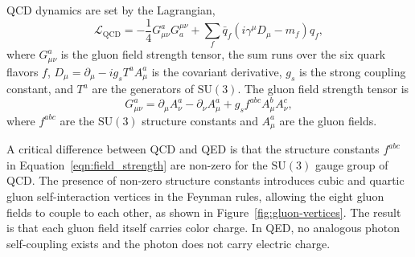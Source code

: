 QCD dynamics are set by the Lagrangian,
\begin{equation}
  \mathcal{L}_{\mathrm{QCD}} = -\frac{1}{4} G^a_{\mu\nu} G^{\mu\nu}_a + \sum_f \bar{q}_f \left( i \gamma^\mu D_\mu - m_f \right) q_f,
  \label{eqn:qcd_lagrangian}
\end{equation}
where $G^a_{\mu\nu}$ is the gluon field strength tensor, the sum runs over the six quark flavors $f$, $D_\mu = \partial_\mu - i g_s T^a A^a_\mu$ is the covariant derivative, $g_s$ is the strong coupling constant, and $T^a$ are the generators of $\mathrm{SU}(3)$.
The gluon field strength tensor is
\begin{equation}
  G^a_{\mu\nu} = \partial_\mu A^a_\nu - \partial_\nu A^a_\mu + g_s f^{abc} A^b_\mu A^c_\nu,
  \label{eqn:field_strength}
\end{equation}
where $f^{abc}$ are the $\mathrm{SU}(3)$ structure constants and $A^a_\mu$ are the gluon fields.

A critical difference between QCD and QED is that the structure constants $f^{abc}$ in Equation~\ref{eqn:field_strength} are non-zero for the $\mathrm{SU}(3)$ gauge group of QCD.
The presence of non-zero structure constants introduces cubic and quartic gluon self-interaction vertices in the Feynman rules, allowing the eight gluon fields to couple to each other, as shown in Figure~\ref{fig:gluon-vertices}.
The result is that each gluon field itself carries color charge.
In QED, no analogous photon self-coupling exists and the photon does not carry electric charge.

